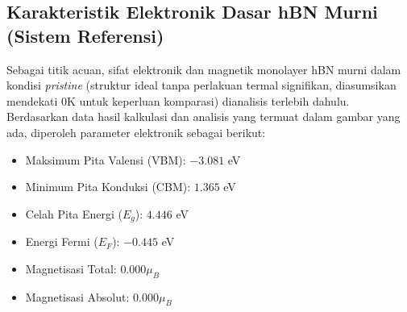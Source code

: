 \subsection{Karakteristik Elektronik Dasar hBN Murni (Sistem Referensi)}
\label{subsec:hbn_murni_dasar}
Sebagai titik acuan, sifat elektronik dan magnetik monolayer hBN murni dalam kondisi \textit{pristine} (struktur ideal tanpa perlakuan termal signifikan, diasumsikan mendekati 0K untuk keperluan komparasi) dianalisis terlebih dahulu. Berdasarkan data hasil kalkulasi dan analisis yang termuat dalam gambar yang ada, diperoleh parameter elektronik sebagai berikut:
\begin{itemize}
    \item Maksimum Pita Valensi (VBM): $-3.081$ eV
    \item Minimum Pita Konduksi (CBM): $1.365$ eV
    \item Celah Pita Energi ($E_g$): $4.446$ eV
    \item Energi Fermi ($E_F$): $-0.445$ eV
    \item Magnetisasi Total: $0.000 \mu_B$
    \item Magnetisasi Absolut: $0.000 \mu_B$
\end{itemize}
